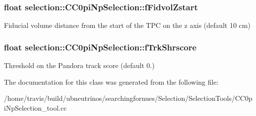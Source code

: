 \subsubsection[{\texorpdfstring{f\+Fidvol\+Zstart}{fFidvolZstart}}]{\setlength{\rightskip}{0pt plus 5cm}float selection\+::\+C\+C0pi\+Np\+Selection\+::f\+Fidvol\+Zstart\hspace{0.3cm}{\ttfamily [private]}}\hypertarget{classselection_1_1CC0piNpSelection_afe5a2b82ecad103b98362839094c47e0}{}\label{classselection_1_1CC0piNpSelection_afe5a2b82ecad103b98362839094c47e0}
Fiducial volume distance from the start of the T\+PC on the z axis (default 10 cm) 
\subsubsection[{\texorpdfstring{f\+Trk\+Shrscore}{fTrkShrscore}}]{\setlength{\rightskip}{0pt plus 5cm}float selection\+::\+C\+C0pi\+Np\+Selection\+::f\+Trk\+Shrscore\hspace{0.3cm}{\ttfamily [private]}}\hypertarget{classselection_1_1CC0piNpSelection_ab72eccf7dab3acafa294a0d8f3e225a0}{}\label{classselection_1_1CC0piNpSelection_ab72eccf7dab3acafa294a0d8f3e225a0}
Threshold on the Pandora track score (default 0.) 

The documentation for this class was generated from the following file\+:\begin{DoxyCompactItemize}
\item 
/home/travis/build/ubneutrinos/searchingfornues/\+Selection/\+Selection\+Tools/C\+C0pi\+Np\+Selection\+\_\+tool.\+cc\end{DoxyCompactItemize}
